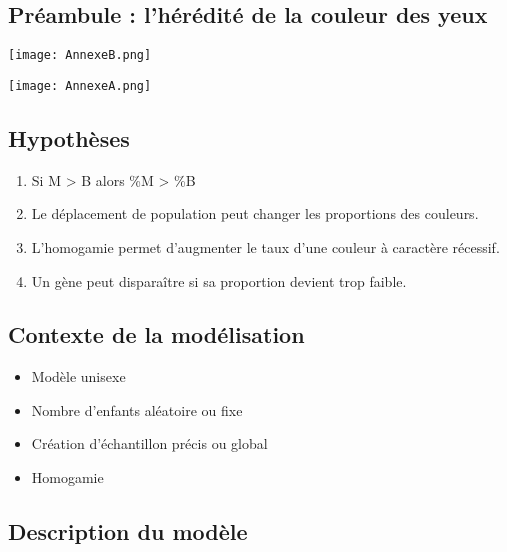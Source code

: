 \documentclass{beamer}
\begin{document}
\subsection{Préambule : l'hérédité de la couleur des yeux}

\begin{frame}
\texttt{[image: AnnexeB.png]}
\end{frame}


\begin{frame}
\texttt{[image: AnnexeA.png]}
\end{frame}


\subsection{Hypothèses}


\begin{frame}
\begin{block}{} 
\begin{enumerate}
\item Si M > B alors \%M > \%B
\item Le déplacement de population peut changer les proportions des couleurs. 
\item L'homogamie permet d'augmenter le taux d'une couleur à caractère récessif.
\item Un gène peut disparaître si sa proportion devient trop faible.
\end{enumerate}
\end{block}
\end{frame}


\subsection{Contexte de la modélisation}
\begin{frame}
\begin{block}{} 
\begin{itemize}
\item Modèle unisexe
\item Nombre d'enfants aléatoire ou fixe
\item Création d'échantillon précis ou global
\item Homogamie 
\end{itemize}
\end{block}
\end{frame}


\subsection{Description du modèle}
\end{document}

